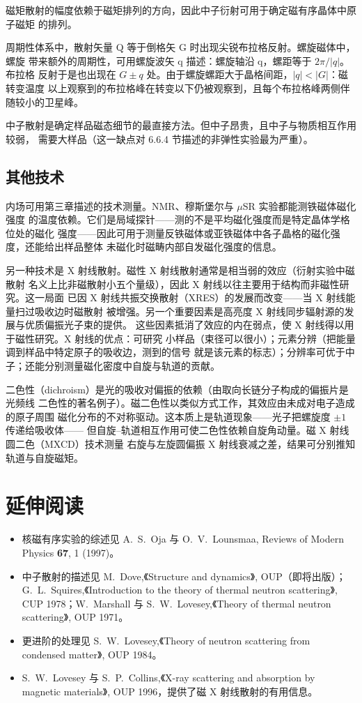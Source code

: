 磁矩散射的幅度依赖于磁矩排列的方向，因此中子衍射可用于确定磁有序晶体中原子磁矩
的排列。

周期性体系中，散射矢量 Q 等于倒格矢 G 时出现尖锐布拉格反射。螺旋磁体中，螺旋
带来额外的周期性，可用螺旋波矢 q 描述：螺旋轴沿 q，螺距等于 $2\pi/|q|$。布拉格
反射于是也出现在 $G\pm q$ 处。由于螺旋螺距大于晶格间距，$|q|<|G|$：磁转变温度
以上观察到的布拉格峰在转变以下仍被观察到，且每个布拉格峰两侧伴随较小的卫星峰。

中子散射是确定样品磁态细节的最直接方法。但中子昂贵，且中子与物质相互作用较弱，
需要大样品（这一缺点对 6.6.4 节描述的非弹性实验最为严重）。

\subsection{其他技术}

内场可用第三章描述的技术测量。NMR、穆斯堡尔与 $\mu$SR 实验都能测铁磁体磁化强度
的温度依赖。它们是局域探针——测的不是平均磁化强度而是特定晶体学格位处的磁化
强度——因此可用于测量反铁磁体或亚铁磁体中各子晶格的磁化强度，还能给出样品整体
未磁化时磁畴内部自发磁化强度的信息。

另一种技术是 X 射线散射。磁性 X 射线散射通常是相当弱的效应（衍射实验中磁散射
名义上比非磁散射小五个量级），因此 X 射线以往主要用于结构而非磁性研究。这一局面
已因 X 射线共振交换散射（XRES）的发展而改变——当 X 射线能量扫过吸收边时磁散射
被增强。另一个重要因素是高亮度 X 射线同步辐射源的发展与优质偏振光子束的提供。
这些因素抵消了效应的内在弱点，使 X 射线得以用于磁性研究。X 射线的优点：可研究
小样品（束径可以很小）；元素分辨（把能量调到样品中特定原子的吸收边，测到的信号
就是该元素的标志）；分辨率可优于中子；还能分别测量磁化密度中自旋与轨道的贡献。

二色性（dichroism）是光的吸收对偏振的依赖（由取向长链分子构成的偏振片是光频线
二色性的著名例子）。磁二色性以类似方式工作，其效应由未成对电子造成的原子周围
磁化分布的不对称驱动。这本质上是轨道现象——光子把螺旋度 $\pm1$ 传递给吸收体——
但自旋--轨道相互作用可使二色性依赖自旋角动量。磁 X 射线圆二色（MXCD）技术测量
右旋与左旋圆偏振 X 射线衰减之差，结果可分别推知轨道与自旋磁矩。

\section*{延伸阅读}

\begin{itemize}[itemsep=0.2em]
\item 核磁有序实验的综述见 A.~S.~Oja 与 O.~V.~Lounsmaa, Reviews of Modern Physics
\textbf{67}, 1 (1997)。
\item 中子散射的描述见 M.~Dove,《Structure and dynamics》, OUP（即将出版）；
G.~L.~Squires,《Introduction to the theory of thermal neutron scattering》,
CUP 1978；W.~Marshall 与 S.~W.~Lovesey,《Theory of thermal neutron scattering》,
OUP 1971。
\item 更进阶的处理见 S.~W.~Lovesey,《Theory of neutron scattering from condensed
matter》, OUP 1984。
\item S.~W.~Lovesey 与 S.~P.~Collins,《X-ray scattering and absorption by magnetic
materials》, OUP 1996，提供了磁 X 射线散射的有用信息。
\end{itemize}

